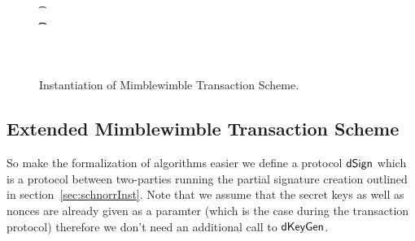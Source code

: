 \begin{figure}
\begin{center}
{\begin{varwidth}{\textwidth}
{            \t \pcif \procVerfProof{\varProofs[\varIterator]}{\varCoinOut[\varIterator]}  \\
            \t \t {} \\
            \varPubKey \opAssign \sum \varOutputs \opSub \sum \varInputs \\
            \pcreturn \procVerf{\varSignature}{\varMsg}{\varPubKey}\\
            }
        \end{varwidth}
        }
    \end{center}
    \caption{Instantiation of Mimblewimble Transaction Scheme. \label{fig:inst-mw-tx}}
\end{figure}

\subsection{Extended Mimblewimble Transaction Scheme}

So make the formalization of algorithms easier we define a protocol $\mathsf{dSign}$ which is a protocol between two-parties running the partial signature creation outlined in section~\ref{sec:schnorrInst}.
Note that we assume that the secret keys as well as nonces are already given as a paramter (which is the case during the transaction protocol) therefore we don't need an additional call to $\mathsf{dKeyGen}$.

